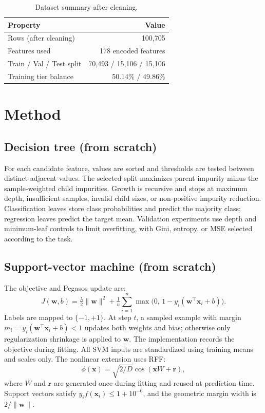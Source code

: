 \documentclass[10pt,twocolumn,a4paper]{article}
\begin{document}
\begin{table}[t]
  \centering
  \caption{Dataset summary after cleaning.}
  \label{tab:data}
  \begin{tabular}{@{}lr@{}}
    \toprule
    Property & Value \\
    \midrule
    Rows (after cleaning)       & 100,705 \\
    Features used               & 178 encoded features \\
    Train / Val / Test split    & 70,493 / 15,106 / 15,106 \\
    Training tier balance      & 50.14\% / 49.86\% \\
    \bottomrule
  \end{tabular}
\end{table}

\section{Method}
\subsection{Decision tree (from scratch)}
For each candidate feature, values are sorted and thresholds are tested
between distinct adjacent values. The selected split maximizes parent
impurity minus the sample-weighted child impurities. Growth is recursive
and stops at maximum depth, insufficient samples, invalid child sizes, or
non-positive impurity reduction. Classification leaves store class
probabilities and predict the majority class; regression leaves predict
the target mean. Validation experiments use depth and minimum-leaf
controls to limit overfitting, with Gini, entropy, or MSE selected
according to the task.

\subsection{Support-vector machine (from scratch)}
The objective and Pegasos update are:
\begin{equation}
  J(\mathbf{w},b)=\tfrac{\lambda}{2}\lVert\mathbf{w}\rVert^{2}
  +\tfrac{1}{n}\sum_{i=1}^{n}\max\!\big(0,\,1-y_i(\mathbf{w}^{\top}\mathbf{x}_i+b)\big).
\end{equation}
Labels are mapped to $\{-1,+1\}$. At step $t$, a sampled example with
margin $m_i=y_i(\mathbf{w}^{\top}\mathbf{x}_i+b)<1$ updates both weights
and bias; otherwise only regularization shrinkage is applied to
$\mathbf{w}$. The implementation records the objective during fitting.
All SVM inputs are standardized using training means and scales only.
The nonlinear extension uses RFF:
\[
\phi(\mathbf{x})=\sqrt{2/D}\cos(\mathbf{x}W+\mathbf{r}),
\]
where $W$ and $\mathbf{r}$ are generated once during fitting and reused
at prediction time. Support vectors satisfy
$y_i f(\mathbf{x}_i)\leq1+10^{-6}$, and the geometric margin width is
$2/\lVert\mathbf{w}\rVert$.
\end{document}
